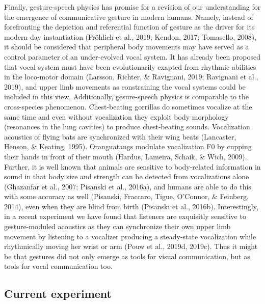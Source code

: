 \documentclass[
  man,floatsintext]{apa6}
\begin{document}
Finally, gesture-speech physics has promise for a revision of our understanding for the emergence of communicative gesture in modern humans. Namely, instead of forefronting the depiction and referential function of gesture as the driver for its modern day instantiation (Fröhlich et al., 2019; Kendon, 2017; Tomasello, 2008), it should be considered that peripheral body movements may have served as a control parameter of an under-evolved vocal system. It has already been proposed that vocal system must have been evolutionarily exapted from rhythmic abilities in the loco-motor domain (Larsson, Richter, \& Ravignani, 2019; Ravignani et al., 2019), and upper limb movements as constraining the vocal systems could be included in this view. Additionally, gesure-speech physics is comparable to the cross-species phenomenon. Chest-beating gorrillas do sometimes vocalize at the same time and even without vocalization they exploit body morphology (resonances in the lung cavities) to produce chest-beating sounds. Vocalization acoustics of flying bats are synchronized with their wing beats (Lancaster, Henson, \& Keating, 1995). Oranguatangs modulate vocalization F0 by cupping their hands in front of their mouth (Hardus, Lameira, Schaik, \& Wich, 2009). Further, it is well known that animals are sensitive to body-related information in sound in that body size and strength can be detected from vocalizations alone (Ghazanfar et al., 2007; Pisanski et al., 2016a), and humans are able to do this with some accuracy as well (Pisanski, Fraccaro, Tigue, O'Connor, \& Feinberg, 2014), even when they are blind from birth (Pisanski et al., 2016b). Interestingly, in a recent experiment we have found that listeners are exquisitly sensitive to gesture-moduled acoustics as they can synchronize their own upper limb movement by listening to a vocalizer producing a steady-state vocalization while rhythmically moving her wrist or arm (Pouw et al., 2019d, 2019c). Thus it might be that gestures did not only emerge as tools for visual communication, but as tools for vocal communication too.

\hypertarget{current-experiment}{%
\subsection{Current experiment}\label{current-experiment}}
\end{document}
